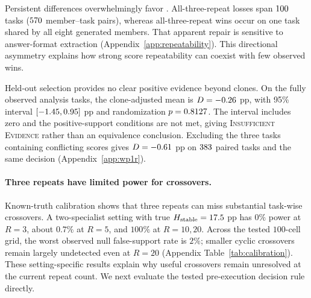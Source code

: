 Persistent differences overwhelmingly favor \bare{}.
All-three-repeat losses span $100$ tasks
($570$ member--task pairs), whereas all-three-repeat wins
occur on one task shared by all eight generated members.
That apparent repair is sensitive to answer-format extraction
(Appendix~\ref{app:repeatability}).
This directional asymmetry explains how strong score repeatability
can coexist with few observed wins.

Held-out selection provides no clear positive evidence beyond clones.
On the fully observed analysis tasks, the clone-adjusted mean is
$D=-0.26$ pp, with 95\% interval $[-1.45, 0.95]$ pp and randomization
$p=0.8127$. The interval includes zero and the positive-support
conditions are not met, giving \textsc{Insufficient Evidence}
rather than an equivalence conclusion.
Excluding the three tasks containing conflicting scores gives
$D=-0.61$ pp on $383$ paired tasks and the same
decision (Appendix~\ref{app:wp1r}).

\paragraph{Three repeats have limited power for crossovers.}
\label{sec:power}
Known-truth calibration shows that three repeats can miss substantial
task-wise crossovers. A two-specialist setting with true
$H_{\rm stable}=17.5$ pp has $0\%$ power at $R=3$, about $0.7\%$
at $R=5$, and $100\%$ at $R=10,20$. Across the tested $100$-cell
grid, the worst observed null false-support rate is $2\%$; smaller
cyclic crossovers remain largely undetected even at $R=20$
(Appendix Table~\ref{tab:calibration}).
These setting-specific results explain why useful crossovers remain
unresolved at the current repeat count. We next evaluate the tested
pre-execution decision rule directly.
